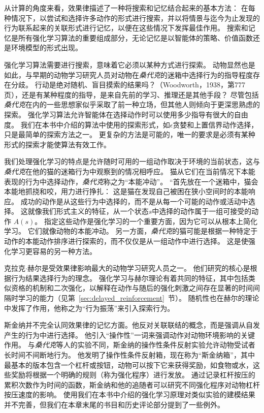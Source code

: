 从计算的角度来看，效果律描述了一种将搜索和记忆结合起来的基本方法：
在每种情况下，以尝试和选择许多动作的形式进行搜索，并以将情景与迄今为止发现的行为联系起来的关联形式进行记忆，以便在这些情况下发挥最佳作用。
搜索和记忆是所有强化学习算法的重要组成部分，无论记忆是以智能体的策略、价值函数还是环境模型的形式出现。


强化学习算法需要进行搜索，意味着它必须以某种方式进行探索。
动物显然也是如此，与早期的动物学习研究人员对动物在\textit{桑代克}的迷箱中选择行为的指导程度存在分歧。
行动是绝对随机、盲目摸索的结果吗？（Woodworth，1938，第777页），还是有某种程度的指导，是来自先前的学习、推理还是其他手段？
尽管包括\textit{桑代克}在内的一些思想家似乎采取了前一种立场，但其他人则倾向于更深思熟虑的探索。
强化学习算法允许智能体在选择动作时可以使用多少指导有很大的自由度。
我们在本书中介绍的算法中使用的探索形式，如$\epsilon$贪婪和上置信界动作选择，只是最简单的探索方法之一。
更复杂的方法是可能的，唯一的要求是必须有某种形式的探索才能使算法有效工作。



我们处理强化学习的特点是允许随时可用的一组动作取决于环境的当前状态，这与\textit{桑代克}在他的猫的迷箱行为中观察到的情况相呼应。
猫从它们在当前情况下本能表现的行为中选择动作，\textit{桑代克}称之为“本能冲动”。
“首先放在一个迷箱中，猫会本能地抓挠和咬，用力进行挣扎：
这是猫在发现自己被困在狭小空间时的本能响应。
成功的动作是从这些行为中选择的，而不是从每一个可能的动作或活动中选择。
这就像我们形式主义的特征，从一个状态$ s $中选择的动作属于一组可接受的动作 $ A(s) $。
指定这些动作是强化学习的一个重要方面，因为它可以从根本上简化学习。
它们就像动物的本能冲动。
另一方面，\textit{桑代克}的猫可能是根据一种特定于动作的本能动作排序进行探索的，而不仅仅是从一组动作中进行选择。
这是使强化学习更容易的另一种方法。


克拉克$\cdot$赫尔\cite{skinner2019behavior}是受效果律影响最大的动物学习研究人员之一。
他们研究的核心是根据行为结果选择行为的理念。
强化学习与赫尔理论有着共同的特征，其中包括类似资格的机制和二次强化，以解释在动作与随后的强化刺激之间存在显著的时间间隔时学习的能力（见第~\ref{sec:delayed_reinforcement}~节）。
随机性也在赫尔的理论中发挥了作用，他称之为“行为振荡”来引入探索行为。


斯金纳并不完全认同效果律的记忆方面。他反对关联联结的概念，而是强调从自发产生的行为中进行选择。
他引入“操作性”一词来强调动作对动物环境影响的关键作用。
与\textit{桑代克}等人的实验不同，斯金纳的操作性条件反射实验允许动物受试者长时间不间断地行为。
他发明了操作性条件反射箱，现在称为“斯金纳箱”，其中最基本的版本包含一个杠杆或按钮，动物可以按下它来获得奖励，如食物或水，这些奖励将根据一个明确的规则（称为强化程序）进行发放。
通过记录杠杆按压的累积次数作为时间的函数，斯金纳和他的追随者可以研究不同强化程序对动物杠杆按压速度的影响。
使用我们在本书中介绍的强化学习原理对类似实验的建模结果并不完善，但我们在本章末尾的书目和历史评论部分提到了一些例外。


